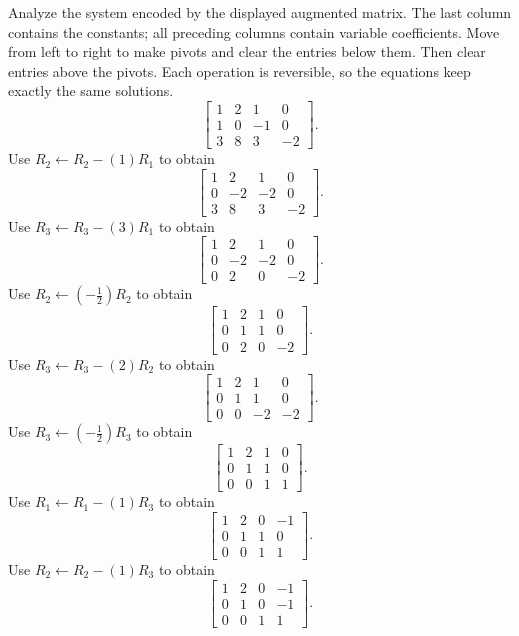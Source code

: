 \goal Analyze the system encoded by the displayed augmented matrix. The last column contains the constants; all preceding columns contain variable coefficients.
\idea Move from left to right to make pivots and clear the entries below them. Then clear entries above the pivots. Each operation is reversible, so the equations keep exactly the same solutions.
\[ \left[\begin{array}{rrr|r}1&2&1&0\\1&0&-1&0\\3&8&3&-2\end{array}\right].\]
Use $R_{2}\leftarrow R_{2}-(1)R_{1}$ to obtain
\[ \left[\begin{array}{rrr|r}1&2&1&0\\0&-2&-2&0\\3&8&3&-2\end{array}\right].\]
Use $R_{3}\leftarrow R_{3}-(3)R_{1}$ to obtain
\[ \left[\begin{array}{rrr|r}1&2&1&0\\0&-2&-2&0\\0&2&0&-2\end{array}\right].\]
Use $R_{2}\leftarrow(- \frac{1}{2})R_{2}$ to obtain
\[ \left[\begin{array}{rrr|r}1&2&1&0\\0&1&1&0\\0&2&0&-2\end{array}\right].\]
Use $R_{3}\leftarrow R_{3}-(2)R_{2}$ to obtain
\[ \left[\begin{array}{rrr|r}1&2&1&0\\0&1&1&0\\0&0&-2&-2\end{array}\right].\]
Use $R_{3}\leftarrow(- \frac{1}{2})R_{3}$ to obtain
\[ \left[\begin{array}{rrr|r}1&2&1&0\\0&1&1&0\\0&0&1&1\end{array}\right].\]
Use $R_{1}\leftarrow R_{1}-(1)R_{3}$ to obtain
\[ \left[\begin{array}{rrr|r}1&2&0&-1\\0&1&1&0\\0&0&1&1\end{array}\right].\]
Use $R_{2}\leftarrow R_{2}-(1)R_{3}$ to obtain
\[ \left[\begin{array}{rrr|r}1&2&0&-1\\0&1&0&-1\\0&0&1&1\end{array}\right].\]
